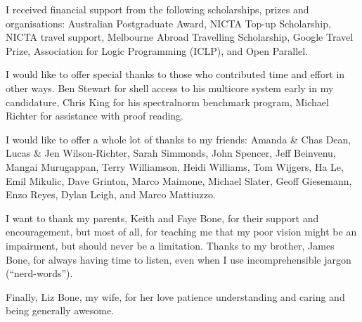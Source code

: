 \documentclass[a4paper,twoside,openright]{report}
\begin{document}
I received financial support from the following scholarships, prizes and
organisations:
Australian Postgraduate Award,
NICTA Top-up Scholarship,
NICTA travel support,
Melbourne Abroad Travelling Scholarship,
Google Travel Prize,
Association for Logic Programming (ICLP),
and
Open Parallel.

I would like to offer special thanks to those who contributed time and
effort in other ways.
Ben Stewart for shell access to his multicore system early in my candidature,
Chris King for his spectralnorm benchmark program,
Michael Richter for assistance with proof reading.

I would like to offer a whole lot of thanks to my friends:
Amanda \& Chas Dean,
Lucas \& Jen Wilson-Richter,
Sarah Simmonds, John Spencer,
Jeff Beinvenu, Mangai Murugappan,
Terry Williamson, Heidi Williams,
Tom Wijgers,
Ha Le,
Emil Mikulic,
Dave Grinton,
Marco Maimone,
Michael Slater,
Geoff Giesemann,
Enzo Reyes,
Dylan Leigh,
and Marco Mattiuzzo.

I want to thank my parents, Keith and Faye Bone, for their support and
encouragement,
but most of all,
for teaching me that my poor vision might be an impairment, but should never
be a limitation.
Thanks to my brother, James Bone, for always having time to listen,
even when I use incomprehensible jargon (``nerd-words'').

Finally, Liz Bone, my wife,
for her love patience understanding and caring
and being generally awesome.


\tableofcontents

\listoffigures

\listoftables

\listofalgorithms











\end{document}
